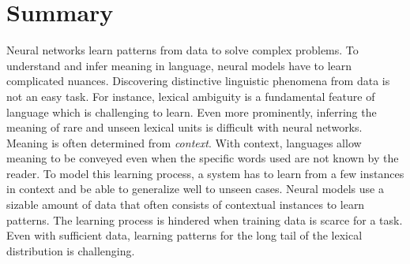 



\renewcommand{\bibsection}{\chapter{Bibliography}}
\renewcommand{\bibname}{Bibliography}
\renewcommand{\bibfont}{\footnotesize}
\setlength{\bibsep}{0pt}







\chapter{Summary}

Neural networks learn patterns from data to solve complex problems.
To understand and infer meaning in language, neural models have to learn complicated nuances.
Discovering distinctive linguistic phenomena from data is not an easy task. 
For instance, lexical ambiguity is a fundamental feature of language which is challenging to learn. 
Even more prominently, inferring the meaning of rare and unseen lexical units is difficult with neural networks. 
Meaning is often determined from \textit{context}.
With context, languages allow meaning to be conveyed even when the specific words used are not known by the reader. 
To model this learning process, a system has to learn from a few instances in context and be able to generalize well to unseen cases.
Neural models use a sizable amount of data that often consists of contextual instances to learn patterns.
The learning process is hindered when training data is scarce for a task.
Even with sufficient data, learning patterns for the long tail of the lexical distribution is challenging. 

